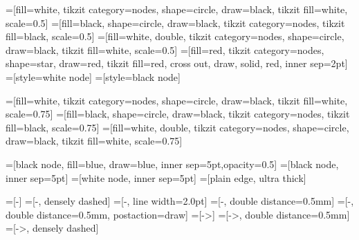 
=[fill=white, tikzit category=nodes, shape=circle, draw=black, tikzit fill=white, scale=0.5]
=[fill=black, shape=circle, draw=black, tikzit category=nodes, tikzit fill=black, scale=0.5]
=[fill=white, double, tikzit category=nodes, shape=circle, draw=black, tikzit fill=white, scale=0.5]
=[fill=red, tikzit category=nodes, shape=star, draw=red, tikzit fill=red, cross out, draw, solid, red, inner sep=2pt]
=[style=white node]
=[style=black node]


=[fill=white, tikzit category=nodes, shape=circle, draw=black, tikzit fill=white, scale=0.75]
=[fill=black, shape=circle, draw=black, tikzit category=nodes, tikzit fill=black, scale=0.75]
=[fill=white, double, tikzit category=nodes, shape=circle, draw=black, tikzit fill=white, scale=0.75]


=[black node, fill=blue, draw=blue, inner sep=5pt,opacity=0.5]
=[black node, inner sep=5pt]
=[white node, inner sep=5pt]
=[plain edge, ultra thick]


=[-]
=[-, densely dashed]
=[-, line width=2.0pt]
=[-, double distance=0.5mm]
=[-, double distance=0.5mm, postaction={draw}]
=[->]
=[->, double distance=0.5mm]
=[->, densely dashed]

